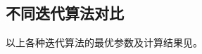 \begin{comment}
res_gmres_size1_*restart15
1 & 600.929 & 19030 & 19030 \\ %
2 & 600.960 & 26496 & 13248 \\ %
3 & 600.944 & 29478 & 9826 \\ %
4 & 600.944 & 30732 & 7683 \\ %
5-22 & \multicolumn{3}{c}{不收敛} \\ %
23 & 601.194 & 24242 & 1054 \\ %
24 & 601.350 & 24192 & 1008 \\ %
25 & 169.182 & 6700 & 268\\
26 & 160.555 & 6292 & 242\\
27 & 161.804 & 6264 & 232\\
28 & 166.328 & 6412 & 229\\
29 & 175.844 & 6612 & 228\\
30 & 185.750 & 6930 & 231\\
31 & 184.314 & 6944 & 224\\
32 & 185.750 & 7104 & 222\\
33 & 187.013 & 7161 & 217\\
34 & 185.983 & 7242 & 213\\
35 & 192.192 & 7385 & 211\\
36 & 192.255 & 7524 & 209\\
37 & 192.816 & 7622 & 206\\
38 & 197.792 & 7752 & 204\\
39 & 198.604 & 7839 & 201\\
40 & 204.251 & 8000 & 200\\
\end{comment}

\subsection{不同迭代算法对比}

以上各种迭代算法的最优参数及计算结果见。

